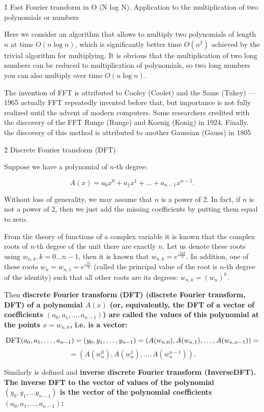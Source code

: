 \h1{ Fast Fourier transform in O (N log N). Application to the multiplication of two polynomials or numbers }

Here we consider an algorithm that allows to multiply two polynomials of length $n$ at time $O(n \log n)$, which is significantly better time $O(n^2)$ achieved by the trivial algorithm for multiplying. It is obvious that the multiplication of two long numbers can be reduced to multiplication of polynomials, so two long numbers you can also multiply over time $O(n \log n)$.

The invention of FFT is attributed to Cooley (Coolet) and the Same (Tukey) --- 1965 actually FFT repeatedly invented before that, but importance is not fully realized until the advent of modern computers. Some researchers credited with the discovery of the FFT Runge (Runge) and Koenig (Konig) in 1924, Finally, the discovery of this method is attributed to another Gaussian (Gauss) in 1805


\h2{ Discrete Fourier transform (DFT) }

Suppose we have a polynomial of $n$-th degree:

$$ A(x) = a_0 x^0 + a_1 x^1 + \ldots + a_{n-1} x^{n-1}. $$

Without loss of generality, we may assume that $n$ is a power of 2. In fact, if $n$ is not a power of 2, then we just add the missing coefficients by putting them equal to zero.

From the theory of functions of a complex variable it is known that the complex roots of $n$-th degree of the unit there are exactly $n$. Let us denote these roots using $w_{n,k}, k = 0 \ldots {n-1}$, then it is known that $w_{n,k} = e^{ i \frac{ 2 \pi k }{ n } }$. In addition, one of these roots $w_n = w_{n,1} = e^{ i \frac{ 2 \pi }{ n } }$ (called the principal value of the root is $n$-th degree of the identity) such that all other roots are its degrees: $w_{n,k} = (w_n)^k$.

Then \bf{discrete Fourier transform (DFT)} (discrete Fourier transform, DFT) of a polynomial $A(x)$ (or, equivalently, the DFT of a vector of coefficients $(a_0, a_1, \dots, a_{n-1})$) are called the values of this polynomial at the points $x = w_{n,k}$, i.e. is a vector:

$$ {\rm DFT}(a_0, a_1, \ldots, a_{n-1}) = (y_0, y_1, \ldots, y_{n-1}) = (A(w_{n,0}), A(w_{n,1}), \ldots, A(w_{n,n-1})) = $$
$$ = (A(w_n^0), A(w_n^1), \ldots, A(w_n^{n-1})). $$

Similarly is defined and \bf{inverse discrete Fourier transform} (InverseDFT). The inverse DFT to the vector of values of the polynomial $(y_0, y_1, \ldots y_{n-1})$ is the vector of the polynomial coefficients $(a_0, a_1, \ldots, a_{n-1})$:

